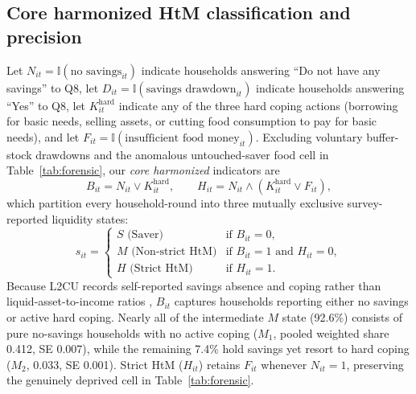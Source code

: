 \documentclass[11pt]{article}
\begin{document}
\subsection{Core harmonized HtM classification and precision}\label{sec:defs}

Let $N_{it} = \mathbb{I}(\text{no savings}_{it})$ indicate households answering ``Do not have any savings'' to Q8, let $D_{it} = \mathbb{I}(\text{savings drawdown}_{it})$ indicate households answering ``Yes'' to Q8, let $K_{it}^{\text{hard}}$ indicate any of the three hard coping actions (borrowing for basic needs, selling assets, or cutting food consumption to pay for basic needs), and let $F_{it} = \mathbb{I}(\text{insufficient food money}_{it})$. Excluding voluntary buffer-stock drawdowns \citep{carroll1997buffer,kaplan2014wealthy} and the anomalous untouched-saver food cell in Table~\ref{tab:forensic}, our \textit{core harmonized} indicators are
\begin{equation}\label{eq:core_defs}
B_{it} = N_{it} \lor K_{it}^{\text{hard}}, \qquad H_{it} = N_{it} \land \left(K_{it}^{\text{hard}} \lor F_{it}\right),
\end{equation}
which partition every household-round into three mutually exclusive survey-reported liquidity states:
\begin{equation}\label{eq:states}
s_{it} = \begin{cases}
S \text{ (Saver)} & \text{if } B_{it} = 0, \\
M \text{ (Non-strict HtM)} & \text{if } B_{it} = 1 \text{ and } H_{it} = 0, \\
H \text{ (Strict HtM)} & \text{if } H_{it} = 1.
\end{cases}
\end{equation}
Because L2CU records self-reported savings absence and coping rather than liquid-asset-to-income ratios \citep{kaplan2014wealthy}, $B_{it}$ captures households reporting either no savings or active hard coping. Nearly all of the intermediate $M$ state (92.6\%) consists of pure no-savings households with no active coping ($M_1$, pooled weighted share 0.412, SE 0.007), while the remaining 7.4\% hold savings yet resort to hard coping ($M_2$, 0.033, SE 0.001). Strict HtM ($H_{it}$) retains $F_{it}$ whenever $N_{it} = 1$, preserving the genuinely deprived cell in Table~\ref{tab:forensic}.
\end{document}
